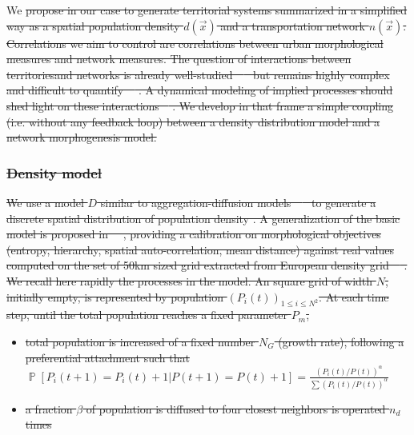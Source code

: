 \documentclass{bmcart}
\DeclareMathOperator{\Proba}{\mathbb{P}}
\newcommand{\Pb}[1]{\ensuremath{\Proba\!\left[#1\right]}}
\providecommand{\DIFdeltex}[1]{{\protect\color{red}\sout{#1}}}                      %
\providecommand{\DIFdelbegin}{} %
\providecommand{\DIFdel}[1]{\texorpdfstring{\DIFdeltex{#1}}{}} %
\newcommand{\DIFscaledelfig}{0.5}
\newlength{\DIFdelgraphicswidth} %
\newlength{\DIFdelgraphicsheight} %
\newcommand{\DIFdelincludegraphics}[2][]{%
\sbox{\DIFdelgraphicsbox}{\DIFOincludegraphics[#1]{#2}}%
\settoboxwidth{\DIFdelgraphicswidth}{\DIFdelgraphicsbox} %
\settoboxtotalheight{\DIFdelgraphicsheight}{\DIFdelgraphicsbox} %
\scalebox{\DIFscaledelfig}{%
\parbox[b]{\DIFdelgraphicswidth}{\usebox{\DIFdelgraphicsbox}\\[-\baselineskip] \rule{\DIFdelgraphicswidth}{0em}}\llap{\resizebox{\DIFdelgraphicswidth}{\DIFdelgraphicsheight}{%
\setlength{\unitlength}{\DIFdelgraphicswidth}%
\begin{picture}(1,1)%
\thicklines\linethickness{2pt} %
{\color[rgb]{1,0,0}\put(0,0){\framebox(1,1){}}}%
{\color[rgb]{1,0,0}\put(0,0){\line( 1,1){1}}}%
{\color[rgb]{1,0,0}\put(0,1){\line(1,-1){1}}}%
\end{picture}%
}\hspace*{3pt}}} %
} %
\DeclareRobustCommand{\DIFdelbegin}{\DIFOdelbegin \let\includegraphics\DIFdelincludegraphics} %
\begin{document}
We \DIFdelbegin \DIFdel{propose in our case to generate territorial systems summarized in a simplified way as a spatial population density $d(\vec{x})$ and a transportation network $n(\vec{x})$. Correlations we aim to control are correlations between urban morphological measures and network measures. The question of interactions between territoriesand networks is already well-studied~\mbox{%
\cite{offner1996reseaux} }%
but remains highly complex and difficult to quantify~\mbox{%
\cite{offner1993effets}}%
. A dynamical modeling of implied processes should shed light on these interactions \mbox{%
\cite{bretagnolle:tel-00459720}}%
. We develop in that frame a simple coupling (i.e. without any feedback loop) between a density distribution model and a network morphogenesis model.
}%

\subsubsection*{\DIFdel{Density model}}

\DIFdel{We use a model $D$ similar to aggregation-diffusion models~\mbox{%
\cite{batty2006hierarchy} }%
to generate a discrete spatial distribution of population density . A generalization of the basic model is proposed in~\mbox{%
\cite{raimbault2018calibration}}%
, providing a calibration on morphological objectives (entropy, hierarchy, spatial auto-correlation, mean distance) against real values computed on the set of 50km sized grid extracted from European density grid~\mbox{%
\cite{eurostat}}%
. We recall here rapidly the processes in the model. An square grid of width $N$, initially empty, is represented by population $(P_i(t))_{1\leq i\leq N^2}$. At each time step, until the total population reaches a fixed parameter $P_m$,
}%
\begin{itemize}%
\item%
\DIFdel{total population is increased of a fixed number $N_G$ (growth rate), following a preferential attachment such that $\Pb{P_i(t+1)=P_i(t)+1|P(t+1)=P(t)+1}=\frac{(P_i(t)/P(t))^{\alpha}}{\sum(P_i(t)/P(t))^{\alpha}}$
}%
\item%
\DIFdel{a fraction $\beta$ of population is diffused to four closest neighbors is operated $n_d$ times
}
\end{itemize}%
\end{document}
